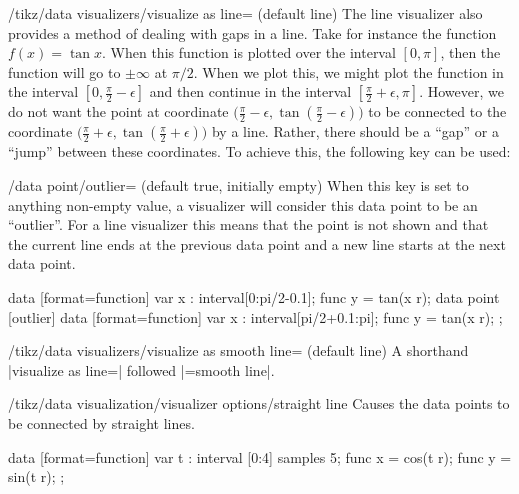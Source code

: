 \begin{key}{/tikz/data visualizers/visualize as line= (default line)}
    The line visualizer also provides a method of dealing with gaps in a line.
    Take for instance the function $f(x) = \tan x$. When this function is
    plotted over the interval $[0,\pi]$, then the function will go to $\pm
    \infty$ at $\pi/2$. When we plot this, we might plot the function in the
    interval $[0,\frac{\pi}{2}-\epsilon]$ and then continue in the interval
    $[\frac{\pi}{2}+\epsilon,\pi]$. However, we do not want the point at
    coordinate $\bigl(\frac{\pi}{2}- \epsilon, \tan(\frac{\pi}{2}-
    \epsilon)\bigr)$ to be connected to the coordinate $\bigl(\frac{\pi}{2}+
    \epsilon, \tan(\frac{\pi}{2}+ \epsilon)\bigr)$ by a line. Rather, there
    should be a ``gap'' or a ``jump'' between these coordinates. To achieve
    this, the following key can be used:
    \begin{key}{/data point/outlier= (default true, initially \normalfont empty)}
        When this key is set to anything non-empty value, a visualizer will
        consider this data point to be an ``outlier''. For a line visualizer
        this means that the point is not shown and that the current line ends
        at the previous data point and a new line starts at the next data
        point.
\begin{codeexample}[
    width=7cm,
    preamble={\usetikzlibrary{datavisualization.formats.functions}},
]
\tikz \datavisualization
 [scientific axes=clean, x axis={grid={major at=(pi/2)}},
  visualize as smooth line]
data [format=function] {
  var x : interval[0:pi/2-0.1];
  func y = tan(\value x r);
}
data point [outlier]
data [format=function] {
  var x : interval[pi/2+0.1:pi];
  func y = tan(\value x r);
};
\end{codeexample}
    \end{key}
\end{key}

\begin{key}{/tikz/data visualizers/visualize as smooth line= (default line)}
    A shorthand |visualize as line=| followed
    |=smooth line|.
\end{key}

\begin{key}{/tikz/data visualization/visualizer options/straight line}
    Causes the data points to be connected by straight lines.
\begin{codeexample}[preamble={\usetikzlibrary{datavisualization.formats.functions}}]
\tikz [scale=.55] \datavisualization
 [scientific axes=clean, all axes={ticks=few},
  visualize as smooth line=my data,  my data={straight line}]
data [format=function] {
  var t : interval [0:4] samples 5;
  func x = cos(\value t r);
  func y = sin(\value t r);
};
\end{codeexample}
\end{key}

